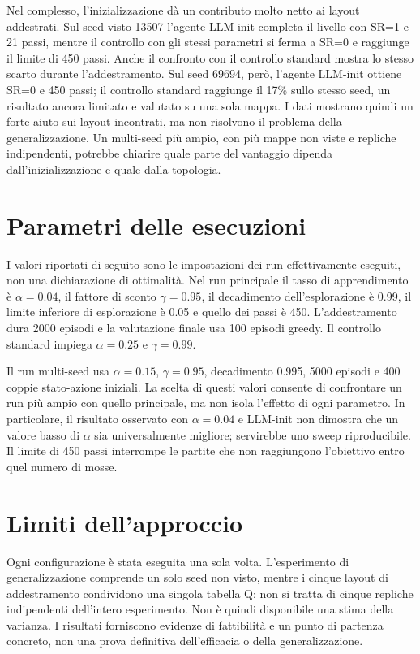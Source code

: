 \documentclass[12pt,a4paper]{article}
\begin{document}
Nel complesso, l'inizializzazione dà un contributo molto netto ai layout addestrati. Sul seed visto 13507 l'agente LLM-init completa il livello con SR=1 e 21 passi, mentre il controllo con gli stessi parametri si ferma a SR=0 e raggiunge il limite di 450 passi. Anche il confronto con il controllo standard mostra lo stesso scarto durante l'addestramento. Sul seed 69694, però, l'agente LLM-init ottiene SR=0 e 450 passi; il controllo standard raggiunge il 17\% sullo stesso seed, un risultato ancora limitato e valutato su una sola mappa. I dati mostrano quindi un forte aiuto sui layout incontrati, ma non risolvono il problema della generalizzazione. Un multi-seed più ampio, con più mappe non viste e repliche indipendenti, potrebbe chiarire quale parte del vantaggio dipenda dall'inizializzazione e quale dalla topologia.


\section{Parametri delle esecuzioni}\label{sec:iperparametri}
I valori riportati di seguito sono le impostazioni dei run effettivamente eseguiti, non una dichiarazione di ottimalità. Nel run principale il tasso di apprendimento è $\alpha=0.04$, il fattore di sconto $\gamma=0.95$, il decadimento dell'esplorazione è 0.99, il limite inferiore di esplorazione è 0.05 e quello dei passi è 450. L'addestramento dura 2000 episodi e la valutazione finale usa 100 episodi greedy. Il controllo standard impiega $\alpha=0.25$ e $\gamma=0.99$.

Il run multi-seed usa $\alpha=0.15$, $\gamma=0.95$, decadimento 0.995, 5000 episodi e 400 coppie stato-azione iniziali. La scelta di questi valori consente di confrontare un run più ampio con quello principale, ma non isola l'effetto di ogni parametro. In particolare, il risultato osservato con $\alpha=0.04$ e LLM-init non dimostra che un valore basso di $\alpha$ sia universalmente migliore; servirebbe uno sweep riproducibile. Il limite di 450 passi interrompe le partite che non raggiungono l'obiettivo entro quel numero di mosse.

\section{Limiti dell'approccio}\label{sec:limiti}
Ogni configurazione è stata eseguita una sola volta. L'esperimento di generalizzazione comprende un solo seed non visto, mentre i cinque layout di addestramento condividono una singola tabella Q: non si tratta di cinque repliche indipendenti dell'intero esperimento. Non è quindi disponibile una stima della varianza. I risultati forniscono evidenze di fattibilità e un punto di partenza concreto, non una prova definitiva dell'efficacia o della generalizzazione.
\end{document}

